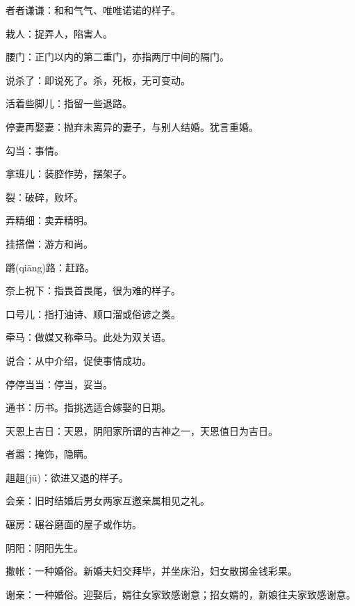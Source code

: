 \startbuffer[886]
者者谦谦：和和气气、唯唯诺诺的样子。
\stopbuffer


\startbuffer[887]
栽人：捉弄人，陷害人。
\stopbuffer


\startbuffer[888]
腰门：正门以内的第二重门，亦指两厅中间的隔门。
\stopbuffer


\startbuffer[889]
说杀了：即说死了。杀，死板，无可变动。
\stopbuffer


\startbuffer[890]
活着些脚儿：指留一些退路。
\stopbuffer


\startbuffer[891]
停妻再娶妻：抛弃未离异的妻子，与别人结婚。犹言重婚。
\stopbuffer


\startbuffer[892]
勾当：事情。
\stopbuffer


\startbuffer[893]
拿班儿：装腔作势，摆架子。
\stopbuffer


\startbuffer[894]
裂：破碎，败坏。
\stopbuffer


\startbuffer[895]
弄精细：卖弄精明。
\stopbuffer


\startbuffer[896]
挂搭僧：游方和尚。
\stopbuffer


\startbuffer[897]
蹡(qiāng)路：赶路。
\stopbuffer


\startbuffer[898]
奈上祝下：指畏首畏尾，很为难的样子。
\stopbuffer


\startbuffer[899]
口号儿：指打油诗、顺口溜或俗谚之类。
\stopbuffer


\startbuffer[900]
牵马：做媒又称牵马。此处为双关语。
\stopbuffer


\startbuffer[901]
说合：从中介绍，促使事情成功。
\stopbuffer


\startbuffer[902]
停停当当：停当，妥当。
\stopbuffer


\startbuffer[903]
通书：历书。指挑选适合嫁娶的日期。
\stopbuffer


\startbuffer[904]
天恩上吉日：天恩，阴阳家所谓的吉神之一，天恩值日为吉日。
\stopbuffer


\startbuffer[905]
者嚣：掩饰，隐瞒。
\stopbuffer


\startbuffer[906]
趄趄(jū)：欲进又退的样子。
\stopbuffer


\startbuffer[907]
会亲：旧时结婚后男女两家互邀亲属相见之礼。
\stopbuffer


\startbuffer[908]
碾房：碾谷磨面的屋子或作坊。
\stopbuffer


\startbuffer[909]
阴阳：阴阳先生。
\stopbuffer


\startbuffer[910]
撒帐：一种婚俗。新婚夫妇交拜毕，并坐床沿，妇女散掷金钱彩果。
\stopbuffer


\startbuffer[911]
谢亲：一种婚俗。迎娶后，婿往女家致感谢意；招女婿的，新娘往夫家致感谢意。
\stopbuffer


